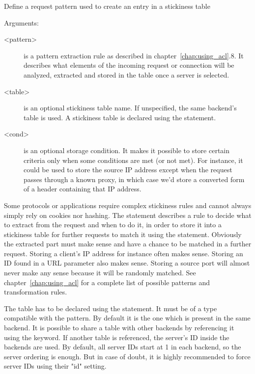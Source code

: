 {  Define a request pattern used to create an entry in a stickiness table


  Arguments:
  \begin{description}
  \item[<pattern>] is a pattern extraction rule as described in chapter~\ref{chap:using_acl}.8. It
               describes what elements of the incoming request or connection
               will be analyzed, extracted and stored in the table once a
               server is selected.

  \item[<table>] is an optional stickiness table name. If unspecified, the same
               backend's table is used. A stickiness table is declared using
               the  statement.

  \item[<cond>] is an optional storage condition. It makes it possible to store
               certain criteria only when some conditions are met (or not met).
               For instance, it could be used to store the source IP address
               except when the request passes through a known proxy, in which
               case we'd store a converted form of a header containing that IP
               address.
  \end{description}

  Some protocols or applications require complex stickiness rules and cannot
  always simply rely on cookies nor hashing. The  statement
  describes a rule to decide what to extract from the request and when to do
  it, in order to store it into a stickiness table for further requests to
  match it using the  statement. Obviously the extracted part must
  make sense and have a chance to be matched in a further request. Storing a
  client's IP address for instance often makes sense. Storing an ID found in a
  URL parameter also makes sense. Storing a source port will almost never make
  any sense because it will be randomly matched. See chapter~\ref{chap:using_acl} for a complete
  list of possible patterns and transformation rules.

  The table has to be declared using the  statement. It must be of
  a type compatible with the pattern. By default it is the one which is present
  in the same backend. It is possible to share a table with other backends by
  referencing it using the  keyword. If another table is referenced,
  the server's ID inside the backends are used. By default, all server IDs
  start at 1 in each backend, so the server ordering is enough. But in case of
  doubt, it is highly recommended to force server IDs using their "id" setting.

}
